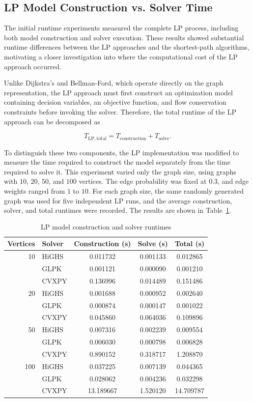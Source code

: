 \documentclass[12pt]{report}
\begin{document}
\subsection{LP Model Construction vs. Solver Time}

The initial runtime experiments measured the complete LP process, including both model construction and solver execution. These results showed substantial runtime differences between the LP approaches and the shortest-path algorithms, motivating a closer investigation into where the computational cost of the LP approach occurred.

Unlike Dijkstra's and Bellman-Ford, which operate directly on the graph representation, the LP approach must first construct an optimization model containing decision variables, an objective function, and flow conservation constraints before invoking the solver. Therefore, the total runtime of the LP approach can be decomposed as

\[
T_{\mathrm{LP,total}}
=
T_{\mathrm{construction}}
+
T_{\mathrm{solve}}.
\]

To distinguish these two components, the LP implementation was modified to measure the time required to construct the model separately from the time required to solve it. This experiment varied only the graph size, using graphs with $10$, $20$, $50$, and $100$ vertices. The edge probability was fixed at $0.3$, and edge weights ranged from $1$ to $10$. For each graph size, the same randomly generated graph was used for five independent LP runs, and the average construction, solver, and total runtimes were recorded. The results are shown in Table~\ref{tab:lp_timing}.

\begin{table}[H]
\centering
\caption{LP model construction and solver runtimes}
\label{tab:lp_timing}
\begin{tabular}{rlccc}
\hline
\textbf{Vertices} & \textbf{Solver} & \textbf{Construction (s)} & \textbf{Solve (s)} & \textbf{Total (s)} \\
\hline
10  & HiGHS & 0.011732 & 0.001133 & 0.012865 \\
    & GLPK  & 0.001121 & 0.000090 & 0.001210 \\
    & CVXPY & 0.136996 & 0.014489 & 0.151486 \\
\hline
20  & HiGHS & 0.001688 & 0.000952 & 0.002640 \\
    & GLPK  & 0.000874 & 0.000147 & 0.001022 \\
    & CVXPY & 0.045860 & 0.064036 & 0.109896 \\
\hline
50  & HiGHS & 0.007316 & 0.002239 & 0.009554 \\
    & GLPK  & 0.006030 & 0.000798 & 0.006828 \\
    & CVXPY & 0.890152 & 0.318717 & 1.208870 \\
\hline
100 & HiGHS & 0.037225 & 0.007139 & 0.044365 \\
    & GLPK  & 0.028062 & 0.004236 & 0.032298 \\
    & CVXPY & 13.189667 & 1.520120 & 14.709787 \\
\hline
\end{tabular}
\end{table}
\end{document}
